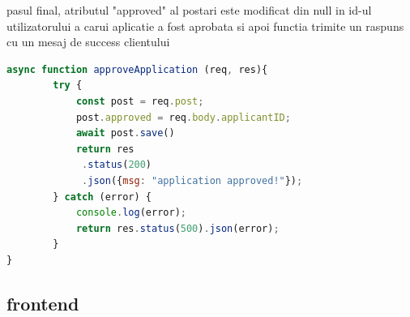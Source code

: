 \documentclass[12pt,a4paper,hidelinks]{report}
\theoremstyle{definition}
\theoremstyle{remark}
\begin{document}
    pasul final, atributul "approved" al postari este modificat din null in id-ul utilizatorului a carui aplicatie a fost aprobata
    si apoi functia trimite un raspuns cu un mesaj de success clientului
    \begin{lstlisting}[language=Javascript]
        async function approveApplication (req, res){
        try {
            const post = req.post;
            post.approved = req.body.applicantID;
            await post.save()
            return res
             .status(200)
             .json({msg: "application approved!"});
        } catch (error) {
            console.log(error);
            return res.status(500).json(error);
        }
}
    \end{lstlisting}
\subsection{frontend}
\end{document}
